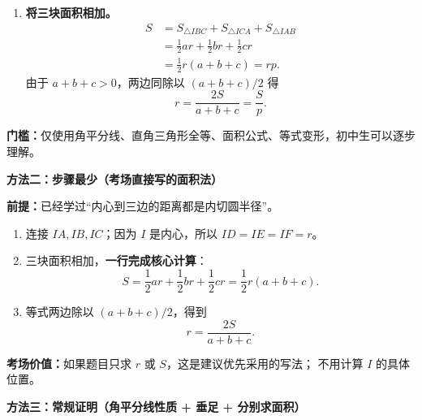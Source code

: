 \begin{proofbox}
\begin{enumerate}[leftmargin=*,itemsep=0.7em]
 \item \textbf{将三块面积相加。}
 \[
 \begin{aligned}
 S&=S_{\triangle IBC}+S_{\triangle ICA}+S_{\triangle IAB}\\
  &=\frac12 ar+\frac12 br+\frac12 cr\\
  &=\frac12 r(a+b+c)=rp.
 \end{aligned}
 \]
 由于 $a+b+c>0$，两边同除以 $(a+b+c)/2$ 得
 \[
  \boxed{r=\frac{2S}{a+b+c}=\frac Sp}.
 \]
\end{enumerate}
\textbf{门槛：}仅使用角平分线、直角三角形全等、面积公式、等式变形，初中生可以逐步理解。

\medskip
\par\noindent\begin{minipage}{\linewidth}
\textbf{\textcolor{CProof}{方法二：步骤最少（考场直接写的面积法）}}

\end{minipage}\par
\textbf{前提：}已经学过“内心到三边的距离都是内切圆半径”。
\begin{enumerate}[leftmargin=*,itemsep=0.55em]
 \item 连接 $IA,IB,IC$；因为 $I$ 是内心，所以
 $ID=IE=IF=r$。
 \item 三块面积相加，\textbf{一行完成核心计算}：
 \[
  S=\frac12ar+\frac12br+\frac12cr
   =\frac12r(a+b+c).
 \]
 \item 等式两边除以 $(a+b+c)/2$，得到
 \[
   \boxed{r=\frac{2S}{a+b+c}}.
 \]
\end{enumerate}
\textbf{考场价值：}如果题目只求 $r$ 或 $S$，这是建议优先采用的写法；
不用计算 $I$ 的具体位置。

\medskip
\par\noindent\begin{minipage}{\linewidth}
\textbf{\textcolor{CProof}{方法三：常规证明（角平分线性质 + 垂足 + 分别求面积）}}


\end{minipage}
\end{proofbox}
